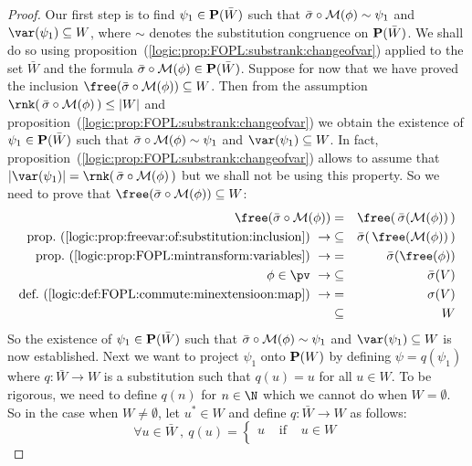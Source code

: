 \begin{proof}
Our first step is to find $\psi_{1}\in{\bf P}(\bar{W})$ such that
$\bar{\sigma}\circ{\cal M}(\phi)\sim\psi_{1}$ and
$\var(\psi_{1})\subseteq W$, where $\sim$ denotes the substitution
congruence on ${\bf P}(\bar{W})$. We shall do so using
proposition~(\ref{logic:prop:FOPL:substrank:changeofvar}) applied to
the set $\bar{W}$ and the formula $\bar{\sigma}\circ{\cal
M}(\phi)\in{\bf P}(\bar{W})$. Suppose for now that we have proved
the inclusion $\free(\bar{\sigma}\circ{\cal M}(\phi))\subseteq W$.
Then from the assumption $\rnk(\,\bar{\sigma}\circ{\cal
M}(\phi)\,)\leq|W|$ and
proposition~(\ref{logic:prop:FOPL:substrank:changeofvar}) we obtain
the existence of $\psi_{1}\in{\bf P}(\bar{W})$ such that
$\bar{\sigma}\circ{\cal M}(\phi)\sim\psi_{1}$ and
$\var(\psi_{1})\subseteq W$. In fact,
proposition~(\ref{logic:prop:FOPL:substrank:changeofvar}) allows to
assume that $|\var(\psi_{1})|=\rnk(\,\bar{\sigma}\circ{\cal
M}(\phi)\,)$ but we shall not be using this property. So we need to
prove that $\free(\bar{\sigma}\circ{\cal M}(\phi))\subseteq W$:
    \begin{eqnarray*}
    \free(\bar{\sigma}\circ{\cal M}(\phi))&=&\free(\,\bar{\sigma}({\cal
    M}(\phi))\,)\\
    \mbox{prop.~(\ref{logic:prop:freevar:of:substitution:inclusion})}\ \rightarrow
    &\subseteq&\bar{\sigma}(\,\free({\cal M}(\phi))\,)\\
    \mbox{prop.~(\ref{logic:prop:FOPL:mintransform:variables})}\ \rightarrow
    &=&\bar{\sigma}(\free(\phi))\\
    \phi\in\pv\ \rightarrow&\subseteq&\bar{\sigma}(V)\\
    \mbox{def.~(\ref{logic:def:FOPL:commute:minextensioon:map})}\ \rightarrow
    &=&\sigma(V)\\
    &\subseteq&W
    \end{eqnarray*}
So the existence of $\psi_{1}\in{\bf P}(\bar{W})$ such that
$\bar{\sigma}\circ{\cal M}(\phi)\sim\psi_{1}$ and
$\var(\psi_{1})\subseteq W$ is now established. Next we want to
project $\psi_{1}$ onto ${\bf P}(W)$ by defining $\psi=q(\psi_{1})$
where $q:\bar{W}\to W$ is a substitution such that $q(u)=u$ for all
$u\in W$. To be rigorous, we need to define $q(n)$ for $n\in\N$
which we cannot do when $W=\emptyset$. So in the case when
$W\neq\emptyset$, let $u^{*}\in W$ and define $q:\bar{W}\to W$ as
follows:
    \[
    \forall u\in \bar{W}\ ,\ q(u)=\left\{
        \begin{array}{lcl}
        u&\mbox{\ if\ }&u\in W\\

\end{array}\]
\end{proof}
